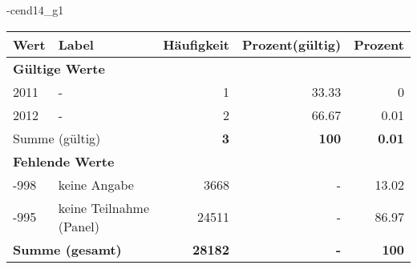                 \vspace*{-\baselineskip}
					\begin{filecontents}{\jobname-cend14_g1}
					\begin{longtable}{lXrrr}
					\toprule
					\textbf{Wert} & \textbf{Label} & \textbf{Häufigkeit} & \textbf{Prozent(gültig)} & \textbf{Prozent} \\
					\endhead
					\midrule
					\multicolumn{5}{l}{\textbf{Gültige Werte}}\\

					2011 &
					\multicolumn{1}{X}{ -  } &


					  \num{1} &
					  \num[round-mode=places,round-precision=2]{33.33} &
					    \num[round-mode=places,round-precision=2]{0} \\

					2012 &
					\multicolumn{1}{X}{ -  } &


					  \num{2} &
					  \num[round-mode=places,round-precision=2]{66.67} &
					    \num[round-mode=places,round-precision=2]{0.01} \\
					\midrule
					\multicolumn{2}{l}{Summe (gültig)} &
					  \textbf{\num{3}} &
					\textbf{\num{100}} &
					  \textbf{\num[round-mode=places,round-precision=2]{0.01}} \\
					\multicolumn{5}{l}{\textbf{Fehlende Werte}}\\
							-998 &
							keine Angabe &
							  \num{3668} &
							 - &
							  \num[round-mode=places,round-precision=2]{13.02} \\
							-995 &
							keine Teilnahme (Panel) &
							  \num{24511} &
							 - &
							  \num[round-mode=places,round-precision=2]{86.97} \\
					\midrule
					\multicolumn{2}{l}{\textbf{Summe (gesamt)}} &
				      \textbf{\num{28182}} &
				    \textbf{-} &
				    \textbf{\num{100}} \\
					\bottomrule
					\end{longtable}
					\end{filecontents}
				\label{tableValues:cend14_g1}
				\vspace*{-\baselineskip}
